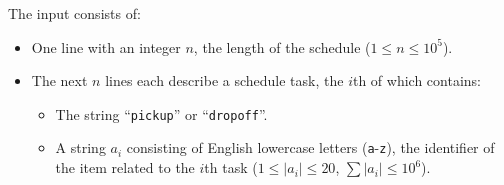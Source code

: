 
    The input consists of:
    \begin{itemize}
        \item One line with an integer $n$, the length of the schedule ($1\leq n\leq 10^5$).
        \item The next $n$ lines each describe a schedule task, the $i$th of which contains:
        \begin{itemize}
            \item The string ``\texttt{pickup}'' or ``\texttt{dropoff}''.
            \item A string $a_i$ consisting of English lowercase letters (\texttt a-\texttt z), the identifier of the item related to the $i$th task ($1\leq |a_i| \leq 20$, $\sum |a_i| \leq 10^6$).
        \end{itemize}
    \end{itemize}
